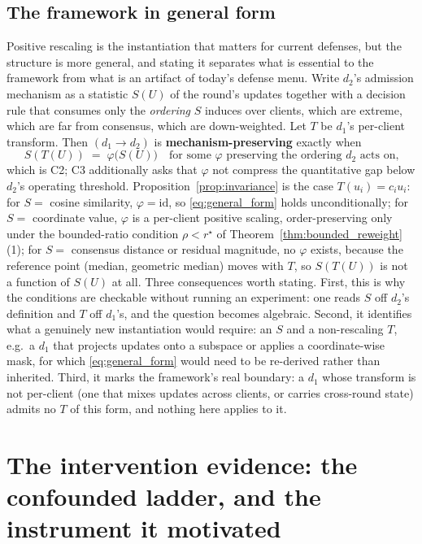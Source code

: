 \documentclass{article}
\begin{document}
\subsection{The framework in general form}
\label{sec:general_form}

Positive rescaling is the instantiation that matters for current defenses, but the structure is more general, and stating it separates what is essential to the framework from what is an artifact of today's defense menu. Write $d_2$'s admission mechanism as a statistic $S(U)$ of the round's updates together with a decision rule that consumes only the \emph{ordering} $S$ induces over clients, which are extreme, which are far from consensus, which are down-weighted. Let $T$ be $d_1$'s per-client transform. Then $(d_1\to d_2)$ is \textbf{mechanism-preserving} exactly when
\begin{equation}
\label{eq:general_form}
S(T(U)) \;=\; \varphi\bigl(S(U)\bigr) \quad\text{for some } \varphi \text{ preserving the ordering } d_2 \text{ acts on,}
\end{equation}
which is C2; C3 additionally asks that $\varphi$ not compress the quantitative gap below $d_2$'s operating threshold. Proposition~\ref{prop:invariance} is the case $T(u_i)=c_iu_i$: for $S=$ cosine similarity, $\varphi=\mathrm{id}$, so \eqref{eq:general_form} holds unconditionally; for $S=$ coordinate value, $\varphi$ is a per-client positive scaling, order-preserving only under the bounded-ratio condition $\rho < r^\star$ of Theorem~\ref{thm:bounded_reweight}(1); for $S=$ consensus distance or residual magnitude, no $\varphi$ exists, because the reference point (median, geometric median) moves with $T$, so $S(T(U))$ is not a function of $S(U)$ at all. Three consequences worth stating. First, this is why the conditions are checkable without running an experiment: one reads $S$ off $d_2$'s definition and $T$ off $d_1$'s, and the question becomes algebraic. Second, it identifies what a genuinely new instantiation would require: an $S$ and a non-rescaling $T$, e.g.\ a $d_1$ that projects updates onto a subspace or applies a coordinate-wise mask, for which \eqref{eq:general_form} would need to be re-derived rather than inherited. Third, it marks the framework's real boundary: a $d_1$ whose transform is not per-client (one that mixes updates across clients, or carries cross-round state) admits no $T$ of this form, and nothing here applies to it.

\section{The intervention evidence: the confounded ladder, and the instrument it motivated}
\label{app:ladder}
\end{document}

